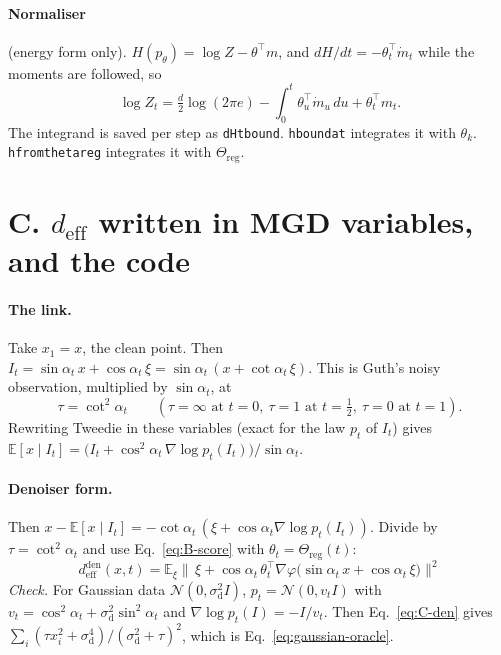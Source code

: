 \documentclass[11pt]{article}
\newcommand{\E}{\mathbb{E}}
\newcommand{\code}[1]{\texttt{#1}}
\renewcommand{\_}{\origunderscore\allowbreak}
\newcommand{\deff}{d_{\mathrm{eff}}}
\begin{document}
\paragraph{Normaliser} (energy form only). $H(p_\theta)=\log Z-\theta^\top m$, and
$dH/dt=-\theta_t^\top\dot m_t$ while the moments are followed, so
\begin{equation}
  \log Z_t=\tfrac d2\log(2\pi e)-\int_0^t\theta_u^\top\dot m_u\,du+\theta_t^\top m_t .
  \label{eq:B-logZ}
\end{equation}
The integrand is saved per step as \code{dH\_t\_bound}. \code{h\_bound\_at} integrates
it with $\theta_k$. \code{h\_from\_theta\_reg} integrates it with $\Theta_{\mathrm{reg}}$.

\section{C. $\deff$ written in MGD variables, and the code}
\label{sec:C}

\paragraph{The link.} Take $x_1=x$, the clean point. Then
$I_t=\sin\alpha_t\,x+\cos\alpha_t\,\xi=\sin\alpha_t\,(x+\cot\alpha_t\,\xi)$. This is Guth's
noisy observation, multiplied by $\sin\alpha_t$, at
\begin{equation}
  \tau=\cot^2\alpha_t \qquad(\tau=\infty\text{ at }t=0,\ \tau=1\text{ at }t=\tfrac12,\ \tau=0\text{ at }t=1).
  \label{eq:C-tau}
\end{equation}
Rewriting Tweedie in these variables (exact for the law $p_t$ of $I_t$) gives
$\E[x\mid I_t]=\big(I_t+\cos^2\!\alpha_t\,\nabla\log p_t(I_t)\big)/\sin\alpha_t$.

\paragraph{Denoiser form.} Then $x-\E[x\mid I_t]=-\cot\alpha_t\,(\xi+\cos\alpha_t\nabla\log p_t(I_t))$.
Divide by $\tau=\cot^2\alpha_t$ and use Eq.~\ref{eq:B-score} with
$\theta_t=\Theta_{\mathrm{reg}}(t)$:
\begin{equation}
  \boxed{\ \deff^{\mathrm{den}}(x,t)=\E_\xi\big\lVert\,\xi+\cos\alpha_t\,\theta_t^\top\nabla\varphi\big(\sin\alpha_t\,x+\cos\alpha_t\,\xi\big)\big\rVert^2\ }
  \label{eq:C-den}
\end{equation}
\emph{Check.} For Gaussian data $\mathcal N(0,\sigma_{\mathrm d}^2 I)$, $p_t=\mathcal N(0,v_tI)$ with
$v_t=\cos^2\!\alpha_t+\sigma_{\mathrm d}^2\sin^2\!\alpha_t$ and $\nabla\log p_t(I)=-I/v_t$. Then Eq.~\ref{eq:C-den}
gives $\sum_i(\tau x_i^2+\sigma_{\mathrm d}^4)/(\sigma_{\mathrm d}^2+\tau)^2$, which is Eq.~\ref{eq:gaussian-oracle}.
\end{document}
